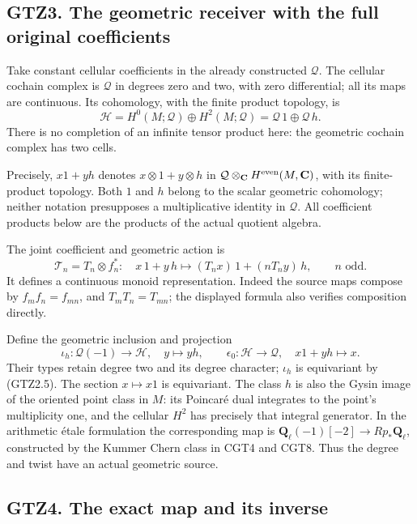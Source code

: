 \subsection{GTZ3. The geometric receiver with the full original
coefficients}\label{gtz3.-the-geometric-receiver-with-the-full-original-coefficients}

Take constant cellular coefficients in the already constructed
\(\mathcal Q\). The cellular cochain complex is \(\mathcal Q\) in
degrees zero and two, with zero differential; all its maps are
continuous. Its cohomology, with the finite product topology, is \[
\mathcal H=H^0(M;\mathcal Q)\oplus H^2(M;\mathcal Q)
=\mathcal Q\,1\oplus\mathcal Q\,h.
\tag{GTZ3.1}
\] There is no completion of an infinite tensor product here: the
geometric cochain complex has two cells.

Precisely, \(x1+yh\) denotes \(x\otimes1+y\otimes h\) in
\(\mathcal Q\otimes_{\mathbf C}H^{\rm even}(M,\mathbf C)\), with its
finite-product topology. Both \(1\) and \(h\) belong to the scalar
geometric cohomology; neither notation presupposes a multiplicative
identity in \(\mathcal Q\). All coefficient products below are the
products of the actual quotient algebra.

The joint coefficient and geometric action is \[
\mathcal T_n=T_n\otimes f_n^*:
\quad x\,1+y\,h\longmapsto (T_nx)\,1+(nT_ny)\,h,
\qquad n\text{ odd}.
\tag{GTZ3.2}
\] It defines a continuous monoid representation. Indeed the source maps
compose by \(f_m f_n=f_{mn}\), and \(T_mT_n=T_{mn}\); the displayed
formula also verifies composition directly.

Define the geometric inclusion and projection \[
\iota_h:\mathcal Q(-1)\to\mathcal H,\quad y\mapsto y h,
\qquad
\epsilon_0:\mathcal H\to\mathcal Q,\quad x1+yh\mapsto x.
\tag{GTZ3.3}
\] Their types retain degree two and its degree character; \(\iota_h\)
is equivariant by (GTZ2.5). The section \(x\mapsto x1\) is equivariant.
The class \(h\) is also the Gysin image of the oriented point class in
\(M\): its Poincaré dual integrates to the point's multiplicity one, and
the cellular \(H^2\) has precisely that integral generator. In the
arithmetic étale formulation the corresponding map is
\(\mathbf Q_\ell(-1)[-2]\to Rp_*\mathbf Q_\ell\), constructed by the
Kummer Chern class in CGT4 and CGT8. Thus the degree and twist have an
actual geometric source.

\subsection{GTZ4. The exact map and its
inverse}\label{gtz4.-the-exact-map-and-its-inverse}

